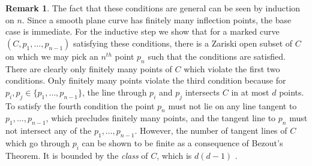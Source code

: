 \documentclass{amsart}
\numberwithin{equation}{section}
\theoremstyle{definition}
\newtheorem{rmk}[prop]{Remark}
\begin{document}
    \begin{rmk}
        
    The fact that these conditions are general can be seen by induction on $n$. Since a smooth plane curve has finitely many inflection points, the base case is immediate. For the inductive step we show that for a marked curve $(C, p_1, \dots, p_{n-1})$ satisfying these conditions, there is a Zariski open subset of $C$ on which we may pick an $n^{th}$ point $p_n$ such that the conditions are satisfied. There are clearly only finitely many points of $C$ which violate the first two conditions. Only finitely many points violate the third condition because for $p_i, p_j \in \{p_1, \dots , p_{n-1}\}$, the line through $p_i$ and $p_j$ intersects $C$ in at most $d$ points. To satisfy the fourth condition the point $p_n$ must not lie on any line tangent to $p_1, \dots , p_{n-1}$, which precludes finitely many points, and the tangent line to $p_n$ must not intersect any of the $p_1, \dots , p_{n-1}$. However, the number of tangent lines of $C$ which go through $p_i$ can be shown to be finite as a consequence of Bezout's Theorem. It is bounded by the \textit{class} of $C$, which is $d(d-1)$ \cite[Example 10.4.1]{FultonInt}.
    \end{rmk}
\end{document}
